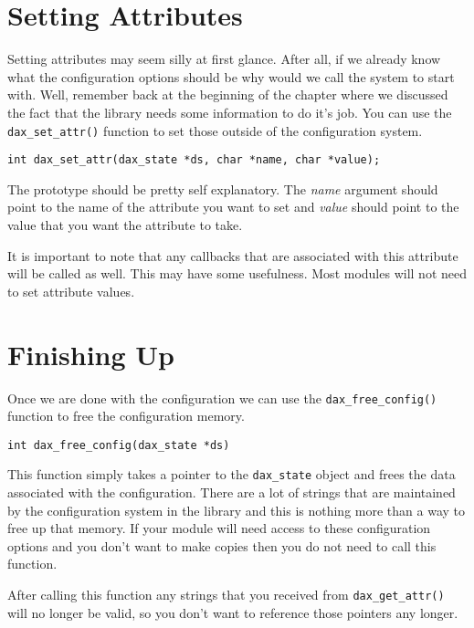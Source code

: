 \section{Setting Attributes}

Setting attributes may seem silly at first glance.  After all, if we already
know what the configuration options should be why would we call the system to
start with.  Well, remember back at the beginning of the chapter where we
discussed the fact that the library needs some information to do it's job.  You
can use the \verb|dax_set_attr()| function to
set those outside of the configuration system.

\begin{verbatim}
int dax_set_attr(dax_state *ds, char *name, char *value);
\end{verbatim}

The prototype should be pretty self explanatory.  The \textit{name} argument
should point to the name of the attribute you want to set and \textit{value}
should point to the value that you want the attribute to take.

It is important to note that any callbacks that are associated with this
attribute will be called as well.  This may have some usefulness.  Most modules
will not need to set attribute values.

\section{Finishing Up}

Once we are done with the configuration we can use the
\verb|dax_free_config()| function to free
the configuration memory.

\begin{verbatim}
int dax_free_config(dax_state *ds)
\end{verbatim}

This function simply takes a pointer to the \verb|dax_state| object and frees
the data associated with the configuration.  There are a lot of strings that are
maintained by the configuration system in the library and this is nothing more
than a way to free up that memory.  If your module will need access to these
configuration options and you don't want to make copies then you do not need to
call this function.

After calling this function any strings that you received from
\verb|dax_get_attr()| will no longer be valid, so you don't want to reference
those pointers any longer.

